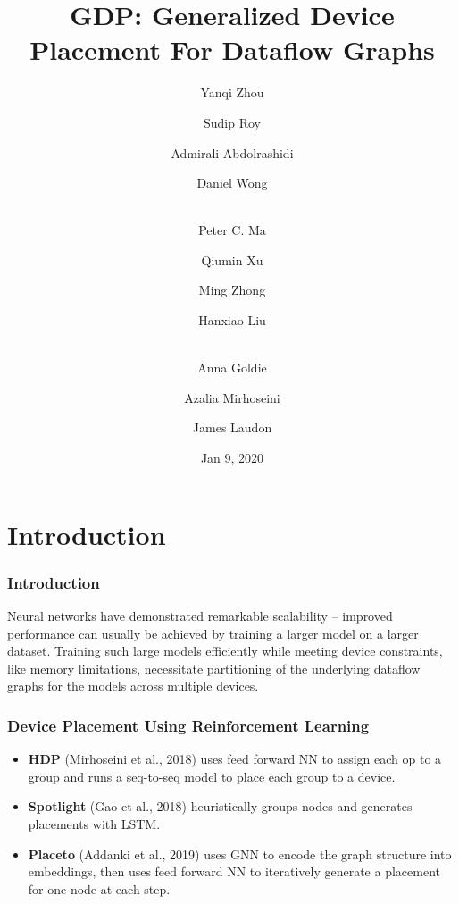 \documentclass[12pt,aspectratio=169]{beamer}
\title{GDP: Generalized Device Placement For Dataflow Graphs}
\author{Yanqi Zhou \and %
        Sudip Roy \and %
        Admirali Abdolrashidi \and %
        Daniel Wong \and \\ %
        Peter C. Ma \and %
        Qiumin Xu \and %
        Ming Zhong \and %
        Hanxiao Liu \and \\ %
        Anna Goldie \and %
        Azalia Mirhoseini \and %
        James Laudon}%
\institute{Google Brain}
\date{Jan 9, 2020}
\begin{document}
    \beamertemplatenavigationsymbolsempty
    
    \begin{frame}
        \titlepage
    \end{frame}

    \section{Introduction}

    \begin{frame}
        \frametitle{Introduction}

        Neural networks have demonstrated remarkable scalability – improved performance can usually be achieved by
        training a larger model on a larger dataset. Training such large models efficiently while meeting device
        constraints, like memory limitations, necessitate partitioning of the underlying dataflow graphs for the models
        across multiple devices.
    \end{frame}

    \begin{frame}
        \frametitle{Device Placement Using Reinforcement Learning}

        \begin{itemize}
            \setlength{\itemsep}{1.4em}
            \item \textbf{HDP} (Mirhoseini et al., 2018) uses feed forward NN to assign each op to a group and runs a
                  seq-to-seq model to place each group to a device.
            \item \textbf{Spotlight} (Gao et al., 2018) heuristically groups nodes and generates placements with LSTM.
            \item \textbf{Placeto} (Addanki et al., 2019) uses GNN to encode the graph structure into embeddings, then
                  uses feed forward NN to iteratively generate a placement for one node at each step.
        \end{itemize}
    \end{frame}
\end{document}
